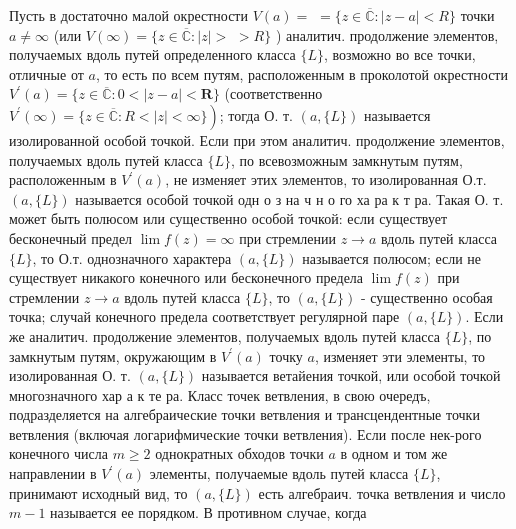 \documentclass[10pt]{article}
\begin{document}
Пусть в достаточно малой окрестности $V(a)=$ $=\{z \in \overline{\mathbb{C}}:|z-a|<R\}$ точки $a \neq \infty$ (или $V(\infty)=\{z \in \overline{\mathbb{C}}:|z|>$ $>R\}$ ) аналитич. продолжение элементов, получаемых вдоль путей определенного класса $\{L\}$, возможно во все точки, отличные от $a$, то есть по всем путям, расположенным в проколотой окрестности $V^{\prime}(a)=\{z \in \overline{\mathbb{C}}: 0<|z-a|<\boldsymbol{R}\}$ (соответственно $\left.V^{\prime}(\infty)=\{z \in \overline{\mathbb{C}}: R<|z|<\infty\}\right)$; тогда О. т. $(a,\{L\})$ называется изолированной особой точкой. Если при этом аналитич. продолжение элементов, получаемых вдоль путей класса $\{L\}$, по всевозможным замкнутым путям, расположенным в $V^{\prime}(a)$, не изменяет этих элементов, то изолированная О.т. $(a,\{L\})$ называется особой точкой одн о з на ч н о го ха ра к т ра. Такая О. т. может быть полюсом или существенно особой точкой: если существует бесконечный предел $\lim f(z)=\infty$ при стремлении $z \rightarrow a$ вдоль путей класса $\{L\}$, то О.т. однозначного характера $(a,\{L\})$ называется полюсом; если не существует никакого конечного или бесконечного предела $\lim f(z)$ при стремлении $z \rightarrow a$ вдоль путей класса $\{L\}$, то $(a,\{L\})$ - существенно особая точка; случай конечного предела соответствует регулярной паре $(a,\{L\})$. Если же аналитич. продолжение элементов, получаемых вдоль путей класса $\{L\}$, по замкнутым путям, окружающим в $V^{\prime}(a)$ точку $a$, изменяет эти элементы, то изолированная О. т. $(a,\{L\})$ называется ветайения точкой, или особой точкой многозначного хар а к те ра. Класс точек ветвления, в свою очередъ, подразделяется на алгебраические точки ветвления и трансцендентные точки ветвления (включая логарифмические точки ветвления). Если после нек-рого конечного числа $m \geqslant 2$ однократных обходов точки $a$ в одном и том же направлении в $V^{\prime}(a)$ элементы, получаемые вдоль путей класса $\{L\}$, принимают исходный вид, то $(a,\{L\})$ есть алгебраич. точка ветвления и число $m-1$ называется ее порядком. В противном случае, когда
\end{document}

